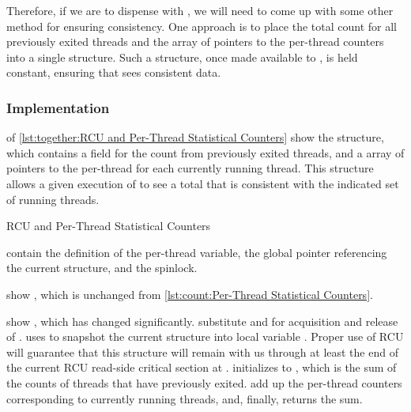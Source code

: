 Therefore, if we are to dispense with , we will need
to come up with some other method for ensuring consistency.
One approach is to place the total count for all previously exited
threads and the array of pointers to the per-thread counters into a single
structure.
Such a structure, once made available to , is
held constant, ensuring that  sees consistent data.

\subsubsection{Implementation}

\begin{fcvref}
 of
\cref{lst:together:RCU and Per-Thread Statistical Counters}
show the  structure, which contains a
 field for the count from previously exited threads,
and a  array of pointers to the per-thread
 for each currently running thread.
This structure allows a given execution of 
to see a total that is consistent with the indicated set of running
threads.

\begin{listing}
\caption{RCU and Per-Thread Statistical Counters}
\label{lst:together:RCU and Per-Thread Statistical Counters}
\end{listing}

contain the definition of the per-thread 
variable, the global pointer  referencing
the current  structure, and
the  spinlock.

 show , which is unchanged from
\cref{lst:count:Per-Thread Statistical Counters}.
\end{fcvref}

\begin{fcvref}
 show , which has changed significantly.
 substitute  and
 for acquisition and release of .
 uses  to snapshot the
current  structure into local variable .
Proper use of RCU will guarantee that this  structure
will remain with us through at least the end of the current RCU
read-side critical section at .
 initializes  to , which is the
sum of the counts of threads that have previously exited.
 add up the per-thread counters corresponding
to currently
running threads, and, finally,  returns the sum.
\end{fcvref}

